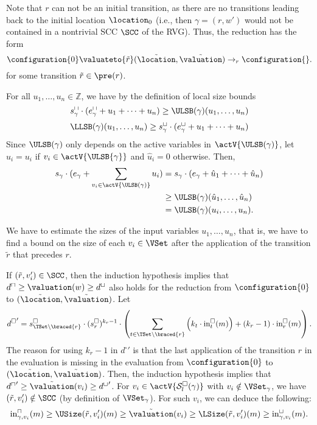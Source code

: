 Note that $r$ can not be an initial transition, as there are no transitions leading back to the initial location $\location_0$
(i.e., then $\gamma = (r, w')$ would not be contained in a nontrivial SCC $\SCC$ of the RVG).
Thus, the reduction has the form
\[ \configuration{0} \valuateto{\tilde{r}} (\tilde{\location}, \tilde{\valuation}) \rightarrow_r \configuration{}. \]
for some transition $\tilde{r} \in \pre(r)$.

For all $u_1, \dots, u_n \in \mathbb{Z}$, we have by the definition of local size bounds
\[ s^\sqcap_\gamma \cdot (e^\sqcap_\gamma + u_1 + \dots + u_n) \geq \ULSB(\gamma)(u_1, \dots, u_n) \]
\[ \LLSB(\gamma)(u_1, \dots, u_n) \geq s^\sqcup_\gamma \cdot (e^\sqcup_\gamma + u_1 + \dots + u_n) \]
Since $\ULSB(\gamma)$ only depends on the active variables in $\actV{\ULSB(\gamma)}$, let $\hat{u}_i = u_i$ if $v_i \in \actV{\ULSB{\gamma}}$ and $\hat{u}_i = 0$ otherwise.
Then,
\begin{align*}
  s_\gamma \cdot (e_\gamma + \sum_{v_i \in \actV{\ULSB(\gamma)}} u_i) &= s_\gamma \cdot (e_\gamma + \hat{u}_1 + \dots + \hat{u}_n) \\
  & \geq \ULSB(\gamma)(\hat{u}_1, \dots, \hat{u}_n) \\
  &= \ULSB(\gamma)(u_i, \dots, u_n).
\end{align*}

We have to estimate the sizes of the input variables $u_1, \dots, u_n$,
that is, we have to find a bound on the size of each $v_i \in \VSet$ after the application of the transition $\tilde{r}$ that precedes $r$.

If $(\tilde{r}, v'_i) \in \SCC$, then the induction hypothesis implies that $d^\sqcap \geq \valuation(w) \geq d^\sqcup$ also holds for the reduction from $\configuration{0}$ to $(\tilde{\location}, \tilde{\valuation})$.
Let
\[ {d^\square}' = s^\square_{\TSet \setminus \braced{r}} \cdot (s^\square_r)^{k_r - 1} \cdot \left( \sum_{t \in \TSet \setminus \braced{r}} \left( k_t \cdot \text{in}^\square_t(m) \right) + \left( k_r - 1 \right) \cdot \text{in}^\square_r(m) \right). \]
The reason for using $k_r - 1$ in ${d^\square}'$ is that the last application of the transition $r$ in the evaluation is missing in the evaluation from $\configuration{0}$ to $(\tilde{\location}, \tilde{\valuation})$.
Then, the induction hypothesis implies that ${d^\sqcap}' \geq \tilde{\valuation}(v_i) \geq {d^\sqcup}'$.
For $v_i \in \actV{\mathcal{S}^\square_l(\gamma)}$ with $v_i \notin \VSet_\gamma$, we have $(\tilde{r}, v'_i) \notin \SCC$ (by definition of $\VSet_\gamma$).
For such $v_i$, we can deduce the following:
\[ \text{in}^\sqcap_{\gamma,{v_i}}(m) \geq \USize(\tilde{r}, v'_i)(m) \geq \tilde{\valuation}(v_i) \geq \LSize(\tilde{r}, v'_i)(m) \geq \text{in}^\sqcup_{\gamma,{v_i}}(m). \]

